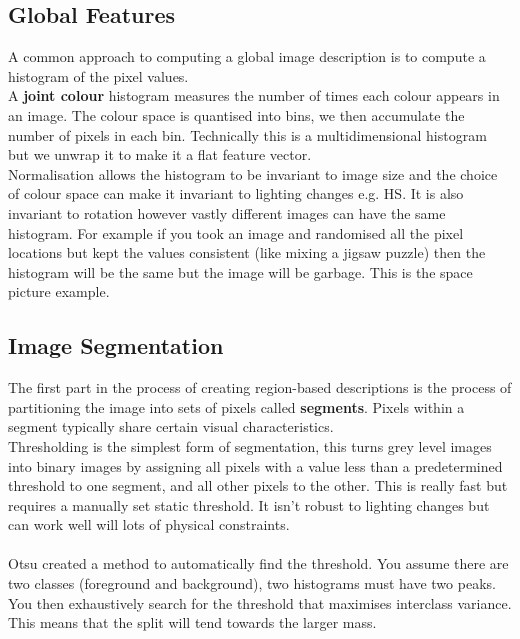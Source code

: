 \documentclass{article}
\begin{document}
	\subsection{Global Features}
	A common approach to computing a global image description is to compute a histogram of the pixel values.\\
	A \textbf{joint colour} histogram measures the number of times each colour appears in an image. The colour space is quantised into bins, we then accumulate the number of pixels in each bin. Technically this is a multidimensional histogram but we unwrap it to make it a flat feature vector.\\
	Normalisation allows the histogram to be invariant to image size and the choice of colour space can make it invariant to lighting changes e.g. HS. It is also invariant to rotation however vastly different images can have the same histogram. For example if you took an image and randomised all the pixel locations but kept the values consistent (like mixing a jigsaw puzzle) then the histogram will be the same but the image will be garbage. This is the space picture example.
	\subsection{Image Segmentation}
	The first part in the process of creating region-based descriptions is the process of partitioning the image into sets of pixels called \textbf{segments}. Pixels within a segment typically share certain visual characteristics.\\
	Thresholding is the simplest form of segmentation, this turns grey level images into binary images by assigning all pixels with a value less than a predetermined threshold to one segment, and all other pixels to the other. This is really fast but requires a manually set static threshold. It isn't robust to lighting changes but can work well will lots of physical constraints.\\\\
	Otsu created a method to automatically find the threshold. You assume there are two classes (foreground and background), two histograms must have two peaks. You then exhaustively search for the threshold that maximises interclass variance. This means that the split will tend towards the larger mass.
\end{document}
